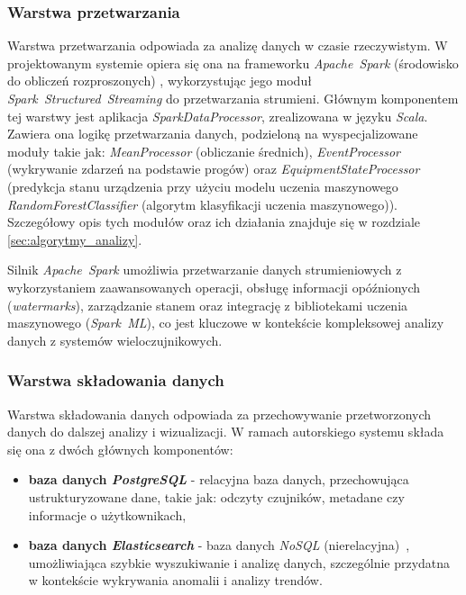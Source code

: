 \subsubsection{Warstwa przetwarzania}
\label{subsubsec:warstwa_przetwarzania}

Warstwa przetwarzania odpowiada za analizę danych w czasie rzeczywistym. W projektowanym systemie opiera się ona na frameworku \mbox{\textit{Apache Spark}} (środowisko do obliczeń rozproszonych) \cite{spark_streaming}, wykorzystując jego moduł \mbox{\textit{Spark Structured Streaming}} do przetwarzania strumieni. Głównym komponentem tej warstwy jest aplikacja \textit{SparkDataProcessor}, zrealizowana w języku \textit{Scala}. Zawiera ona logikę przetwarzania danych, podzieloną na wyspecjalizowane moduły takie jak: \textit{MeanProcessor} (obliczanie średnich), \textit{EventProcessor} (wykrywanie zdarzeń na podstawie progów) oraz \textit{EquipmentStateProcessor} (predykcja stanu urządzenia przy użyciu modelu uczenia maszynowego \textit{RandomForestClassifier} (algorytm klasyfikacji uczenia maszynowego)). Szczegółowy opis tych modułów oraz ich działania znajduje się w rozdziale \ref{sec:algorytmy_analizy}.

Silnik \mbox{\textit{Apache Spark}} umożliwia przetwarzanie danych strumieniowych z wykorzystaniem zaawansowanych operacji, obsługę informacji opóźnionych (\textit{watermarks}), zarządzanie stanem oraz integrację z bibliotekami uczenia maszynowego (\mbox{\textit{Spark ML}}), co jest kluczowe w kontekście kompleksowej analizy danych z systemów wieloczujnikowych.

\newpage


\subsubsection{Warstwa składowania danych}
\label{subsubsec:warstwa_skladowania}

Warstwa składowania danych odpowiada za przechowywanie przetworzonych danych do dalszej analizy i wizualizacji. W ramach autorskiego systemu składa się ona z dwóch głównych komponentów:

\begin{itemize}
    \item \textbf{baza danych \textit{PostgreSQL}} - relacyjna baza danych, przechowująca ustrukturyzowane dane, takie jak: odczyty czujników, metadane czy informacje o użytkownikach,
    \item \textbf{baza danych \textit{Elasticsearch}} - baza danych \mbox{\textit{NoSQL}} (nierelacyjna)~\cite{nosql_definition}, umożliwiająca szybkie wyszukiwanie i analizę danych, szczególnie przydatna w kontekście wykrywania anomalii i analizy trendów.
\end{itemize}

